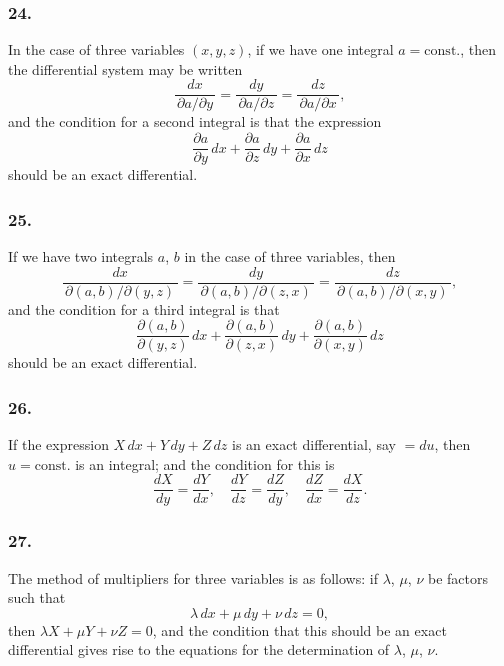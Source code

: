\documentclass[12pt,a4paper]{article}
\theoremstyle{plain}
\begin{document}
\newpage
\setcounter{page}{123}

\subsubsection*{24.}

In the case of three variables $(x, y, z)$, if we have one integral $a = \text{const.}$, then the differential system may be written
\[
\frac{dx}{\,\partial a/\partial y\,} = \frac{dy}{\,\partial a/\partial z\,} = \frac{dz}{\,\partial a/\partial x\,},
\]
and the condition for a second integral is that the expression
\[
\frac{\partial a}{\partial y}\,dx + \frac{\partial a}{\partial z}\,dy + \frac{\partial a}{\partial x}\,dz
\]
should be an exact differential.

\subsubsection*{25.}

If we have two integrals $a$, $b$ in the case of three variables, then
\[
\frac{dx}{\,\partial(a, b)/\partial(y, z)\,} = \frac{dy}{\,\partial(a, b)/\partial(z, x)\,} = \frac{dz}{\,\partial(a, b)/\partial(x, y)\,},
\]
and the condition for a third integral is that
\[
\frac{\partial(a, b)}{\partial(y, z)}\,dx + \frac{\partial(a, b)}{\partial(z, x)}\,dy + \frac{\partial(a, b)}{\partial(x, y)}\,dz
\]
should be an exact differential.

\subsubsection*{26.}

If the expression $X\,dx + Y\,dy + Z\,dz$ is an exact differential, say $= du$, then $u = \text{const.}$ is an integral; and the condition for this is
\[
\frac{dX}{dy} = \frac{dY}{dx}, \quad \frac{dY}{dz} = \frac{dZ}{dy}, \quad \frac{dZ}{dx} = \frac{dX}{dz}.
\]

\subsubsection*{27.}

The method of multipliers for three variables is as follows: if $\lambda$, $\mu$, $\nu$ be factors such that
\[
\lambda\,dx + \mu\,dy + \nu\,dz = 0,
\]
then $\lambda X + \mu Y + \nu Z = 0$, and the condition that this should be an exact differential gives rise to the equations for the determination of $\lambda$, $\mu$, $\nu$.
\end{document}
